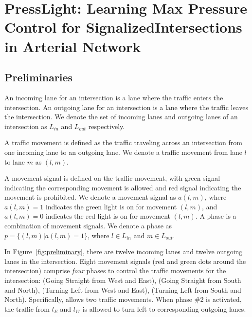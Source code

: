 \chapter{PressLight: Learning Max Pressure Control for SignalizedIntersections in Arterial Network}
\label{chap:presslight}

\section{Preliminaries}
\label{sec:preliminary}

\begin{definition}
An incoming lane for an intersection is a lane where the traffic enters the intersection. 
An outgoing lane for an intersection is a lane where the traffic leaves the intersection. 
We denote the set of incoming lanes and outgoing lanes of an intersection as $L_{in}$ and $L_{out}$ respectively.
\end{definition}
\vspace{-3mm}
\begin{definition}
A traffic movement is defined as the traffic traveling across an intersection from one incoming lane to an outgoing lane. We denote a traffic movement from lane $l$ to lane $m$ as $(l,m)$. 
\end{definition}
\vspace{-3mm}
\begin{definition}
A movement signal is defined on the traffic movement, with green signal indicating the corresponding movement is allowed and red signal indicating the movement is prohibited. We denote a movement signal as $a(l,m)$, where $a(l,m)=1$ indicates the green light is on for movement $(l,m)$, and $a(l,m)=0$ indicates the red light is on for movement $(l,m)$.
A phase is a combination of movement signals. We denote a phase as $p=\{(l,m)| a(l,m)=1\}$, where $l\in L_{in}$ and $m\in L_{out}$.
\end{definition}
In Figure~\ref{fig:preliminary}, there are twelve incoming lanes and twelve outgoing lanes in the intersection. Eight movement signals (red and green dots around the intersection) comprise \emph{four} phases to control the traffic movements for the intersection: \WEs (Going Straight from West and East), \SNs (Going Straight from South and North), \WEl (Turning Left from West and East), \SNl (Turning Left from South and North).  Specifically, \WEl allows two traffic movements. When phase \#2 is activated, the traffic from $l_E$ and $l_W$ is allowed to turn left to corresponding outgoing lanes.

